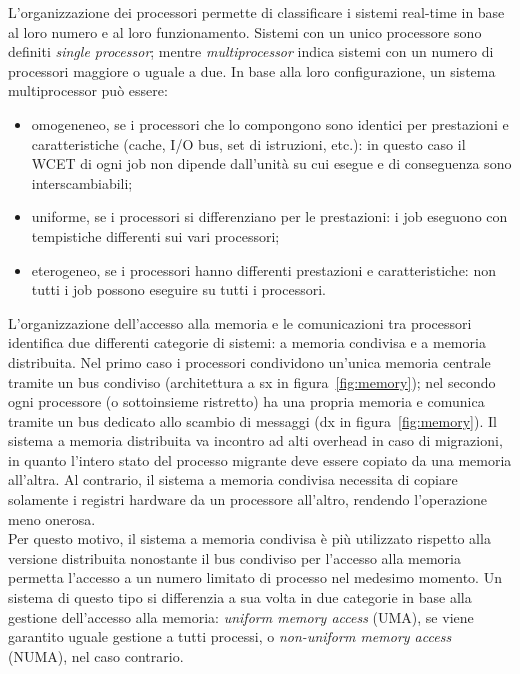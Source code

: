L'organizzazione dei processori permette di classificare i sistemi real-time in base al loro numero e al loro funzionamento. Sistemi con un unico processore sono definiti \textit{single processor}; mentre \textit{multiprocessor} indica sistemi con un numero di processori maggiore o uguale a due. In base alla loro configurazione, un sistema multiprocessor può essere:

\begin{itemize}
	\item omogeneneo, se i processori che lo compongono sono identici per prestazioni e caratteristiche (cache, I/O bus, set di istruzioni, etc.): in questo caso il WCET di ogni job non dipende dall'unità su cui esegue e di conseguenza sono interscambiabili;
	\item uniforme, se i processori si differenziano per le prestazioni: i job eseguono con tempistiche differenti sui vari processori;
	\item eterogeneo, se i processori hanno differenti prestazioni e caratteristiche: non tutti i job possono eseguire su tutti i processori.
\end{itemize}

L'organizzazione dell'accesso alla memoria e le comunicazioni tra processori identifica due differenti categorie di sistemi: a memoria condivisa e a memoria distribuita. Nel primo caso i processori condividono un'unica memoria centrale tramite un bus condiviso (architettura a sx in figura~\ref{fig:memory}); nel secondo ogni processore (o sottoinsieme ristretto) ha una propria memoria e comunica tramite un bus dedicato allo scambio di messaggi (dx in figura~\ref{fig:memory}). Il sistema a memoria distribuita va incontro ad alti overhead in caso di migrazioni, in quanto l'intero stato del processo migrante deve essere copiato da una memoria all'altra. Al contrario, il sistema a memoria condivisa necessita di copiare solamente i registri hardware da un processore all'altro, rendendo l'operazione meno onerosa.\\
Per questo motivo, il sistema a memoria condivisa è più utilizzato rispetto alla versione distribuita nonostante il bus condiviso per l'accesso alla memoria permetta l'accesso a un numero limitato di processo nel medesimo momento. Un sistema di questo tipo si differenzia a sua volta in due categorie in base alla gestione dell'accesso alla memoria: \textit{uniform memory access} (UMA), se viene garantito uguale gestione a tutti processi, o \textit{non-uniform memory access} (NUMA), nel caso contrario.\\

